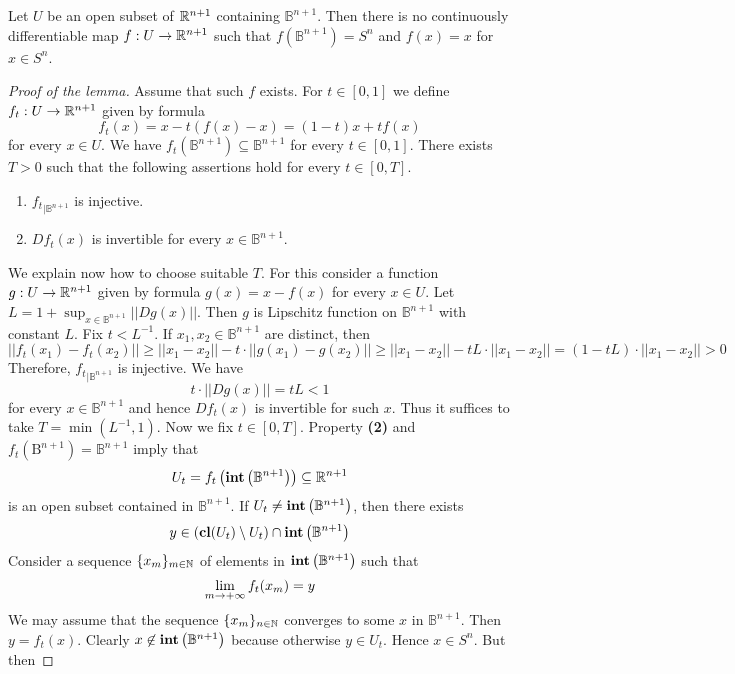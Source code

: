 \begin{lemma}\label{lemma:thereisnodifferentiableretraction}
Let $U$ be an open subset of ${\mathbb R}^{n+1}$ containing $\mathbb{B}^{n+1}$. Then there is no continuously differentiable map $f:U\rightarrow {\mathbb R}^{n+1}$ such that $f(\mathbb{B}^{n+1}) = S^{n}$ and $f(x) = x$ for $x\in S^n$. 
\end{lemma}
\begin{proof}[Proof of the lemma]
Assume that such $f$ exists. For $t\in [0,1]$ we define $f_t:U\rightarrow {\mathbb R}^{n+1}$ given by formula
$$f_t(x) = x - t(f(x) - x) = (1-t)x + tf(x)$$
for every $x\in U$. We have $f_t\left(\mathbb{B}^{n+1}\right) \subseteq \mathbb{B}^{n+1}$ for every $t\in [0,1]$. There exists $T>0$ such that the following assertions hold for every $t\in [0,T]$.
\begin{enumerate}[label=\textbf{(\arabic*)}, leftmargin=1.5em]
\item ${f_t}_{\mid \mathbb{B}^{n+1}}$ is injective.
\item $Df_t(x)$ is invertible for every $x\in \mathbb{B}^{n+1}$.
\end{enumerate}
We explain now how to choose suitable $T$. For this consider a function $g:U\rightarrow {\mathbb R}^{n+1}$ given by formula $g(x)= x - f(x)$ for every $x\in U$. Let $L = 1 + \sup_{x\in \mathbb{B}^{n+1}}||Dg(x)||$. Then $g$ is Lipschitz function on $\mathbb{B}^{n+1}$ with constant $L$. Fix $t < L^{-1}$. If $x_1,x_2\in \mathbb{B}^{n+1}$ are distinct, then
$$||f_t(x_1) - f_t(x_2)|| \geq ||x_1-x_2|| - t\cdot ||g(x_1) - g(x_2)|| \geq ||x_1 - x_2|| - tL\cdot ||x_1 - x_2|| = \left(1 - tL\right)\cdot ||x_1 - x_2|| > 0 $$
Therefore, ${f_t}_{\mid \mathbb{B}^{n+1}}$ is injective. We have
$$t\cdot ||Dg(x)|| = tL < 1$$
for every $x\in \mathbb{B}^{n+1}$ and hence $Df_t(x)$ is invertible for such $x$. Thus it suffices to take $T = \min \left(L^{-1}, 1 \right)$. Now we fix $t\in [0,T]$. Property \textbf{(2)} and $f_t\left(\mathrm{B}^{n+1}\right) = \mathbb{B}^{n+1}$ imply that
$$U_t = f_t\left(\mathbf{int}\left(\mathbb{B}^{n+1}\right)\right)\subseteq {\mathbb R}^{n+1}$$
is an open subset contained in $\mathbb{B}^{n+1}$. If $U_t \neq \mathbf{int}\left(\mathbb{B}^{n+1}\right)$, then there exists
$$y \in \left(\mathbf{cl}(U_t) \setminus U_t\right) \cap \mathbf{int}\left(\mathbb{B}^{n+1}\right)$$
Consider a sequence $\{x_m\}_{m\in {\mathbb N}}$ of elements in $\mathbf{int}\left(\mathbb{B}^{n+1}\right)$ such that
$$\lim_{m\rightarrow +\infty}f_t(x_m) = y$$
We may assume that the sequence $\{x_m\}_{n\in {\mathbb N}}$ converges to some $x$ in $\mathbb{B}^{n+1}$. Then $y = f_t(x)$. Clearly $x \not \in \mathbf{int}\left(\mathbb{B}^{n+1}\right)$ because otherwise $y \in U_t$. Hence $x\in S^n$. But then

\end{proof}
